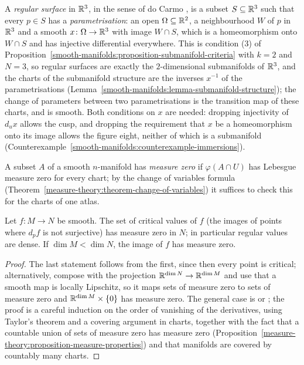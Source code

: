 \begin{remark}\label{smooth-manifolds:remark-do-carmo}
A \emph{regular surface} in $\mathbb{R}^3$, in the sense of do Carmo \cite[Section 2.2]{do-carmo-curves-surfaces}, is a subset $S \subseteq \mathbb{R}^3$ such that every
$p \in S$ has a \emph{parametrisation}: an open $\Omega \subseteq \mathbb{R}^2$, a neighbourhood $W$ of $p$ in $\mathbb{R}^3$ and a smooth $x \colon \Omega \to \mathbb{R}^3$ with
image $W \cap S$, which is a homeomorphism onto $W \cap S$ and has injective differential everywhere. This is condition (3) of
Proposition~\ref{smooth-manifolds:proposition-submanifold-criteria} with $k = 2$ and $N = 3$, so regular surfaces are exactly the $2$-dimensional submanifolds
of $\mathbb{R}^3$, and the charts of the submanifold structure are the inverses $x^{-1}$ of the parametrisations (Lemma~\ref{smooth-manifolds:lemma-submanifold-structure});
the change of parameters between two parametrisations is the transition map of these charts, and is smooth. Both conditions on $x$ are needed: dropping
injectivity of $d_ux$ allows the cusp, and dropping the requirement that $x$ be a homeomorphism onto its image allows the figure eight, neither of which is a
submanifold (Counterexample~\ref{smooth-manifolds:counterexample-immersions}).
\end{remark}

\begin{definition}\label{smooth-manifolds:definition-measure-zero}
A subset $A$ of a smooth $n$-manifold has \emph{measure zero} if $\varphi(A \cap U)$ has Lebesgue measure zero for every chart; by the change of variables formula
(Theorem~\ref{measure-theory:theorem-change-of-variables}) it suffices to check this for the charts of one atlas.
\end{definition}

\begin{theorem}[Sard]\label{smooth-manifolds:theorem-sard}
Let $f \colon M \to N$ be smooth. The set of critical values of $f$ (the images of points where $d_pf$ is not surjective) has measure zero in $N$; in particular regular values are dense. If
$\dim M < \dim N$, the image of $f$ has measure zero.
\end{theorem}

\begin{proof}
The last statement follows from the first, since then every point is critical; alternatively, compose with the projection $\mathbb{R}^{\dim N} \to \mathbb{R}^{\dim M}$ and use that a smooth map is locally Lipschitz, so
it maps sets of measure zero to sets of measure zero and $\mathbb{R}^{\dim M} \times \{0\}$ has measure zero. The general case is \cite[Chapter 2]{milnor-differential-viewpoint} or
\cite[Chapter 6]{lee-smooth-manifolds}; the proof is a careful induction on the order of vanishing of the derivatives, using Taylor's theorem and a covering argument in charts, together with the fact that a
countable union of sets of measure zero has measure zero (Proposition~\ref{measure-theory:proposition-measure-properties}) and that manifolds are covered by countably many charts.
\end{proof}

